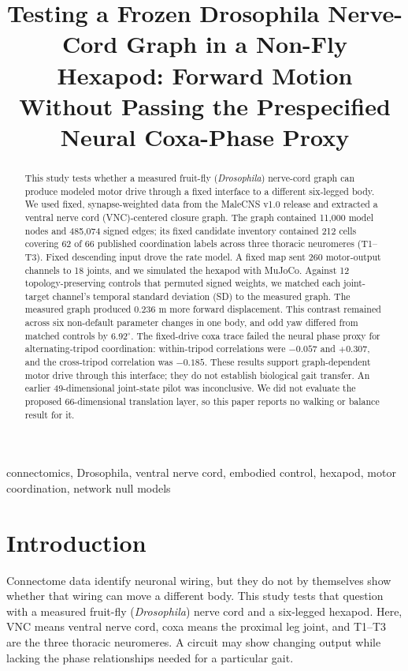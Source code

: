 \documentclass[conference]{IEEEtran}
\title{Testing a Frozen Drosophila Nerve-Cord Graph in a Non-Fly Hexapod: Forward Motion Without Passing the Prespecified Neural Coxa-Phase Proxy}
\author{
  \IEEEauthorblockN{Puneeth Pradeep}
  \IEEEauthorblockA{High School Student Researcher\\
  Chicago, Illinois, USA\\
  \mbox{puneethp2009@gmail.com}}
}
\begin{document}
\maketitle

\begin{abstract}
This study tests whether a measured fruit-fly (\textit{Drosophila}) nerve-cord graph can produce modeled motor drive through a fixed interface to a different six-legged body. We used fixed, synapse-weighted data from the MaleCNS v1.0 release and extracted a ventral nerve cord (VNC)-centered closure graph. The graph contained 11,000 model nodes and 485,074 signed edges; its fixed candidate inventory contained 212 cells covering 62 of 66 published coordination labels across three thoracic neuromeres (T1--T3). Fixed descending input drove the rate model. A fixed map sent 260 motor-output channels to 18 joints, and we simulated the hexapod with MuJoCo. Against 12 topology-preserving controls that permuted signed weights, we matched each joint-target channel's temporal standard deviation (SD) to the measured graph. The measured graph produced 0.236 m more forward displacement. This contrast remained across six non-default parameter changes in one body, and odd yaw differed from matched controls by 6.92$^{\circ}$. The fixed-drive coxa trace failed the neural phase proxy for alternating-tripod coordination: within-tripod correlations were $-0.057$ and $+0.307$, and the cross-tripod correlation was $-0.185$. These results support graph-dependent motor drive through this interface; they do not establish biological gait transfer. An earlier 49-dimensional joint-state pilot was inconclusive. We did not evaluate the proposed 66-dimensional translation layer, so this paper reports no walking or balance result for it.
\end{abstract}

\begin{IEEEkeywords}
connectomics, Drosophila, ventral nerve cord, embodied control, hexapod, motor coordination, network null models
\end{IEEEkeywords}

\section{Introduction}
\label{sec:introduction}
Connectome data identify neuronal wiring, but they do not by themselves show whether that wiring can move a different body. This study tests that question with a measured fruit-fly (\textit{Drosophila}) nerve cord and a six-legged hexapod. Here, VNC means ventral nerve cord, coxa means the proximal leg joint, and T1--T3 are the three thoracic neuromeres. A circuit may show changing output while lacking the phase relationships needed for a particular gait.
\end{document}
